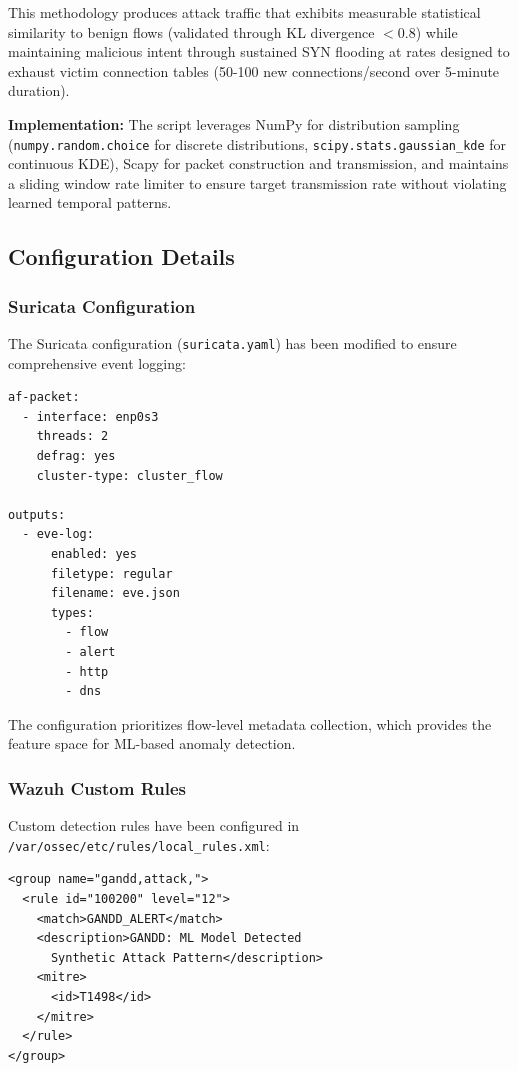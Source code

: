 This methodology produces attack traffic that exhibits measurable statistical similarity to benign flows (validated through KL divergence $< 0.8$) while maintaining malicious intent through sustained SYN flooding at rates designed to exhaust victim connection tables (50-100 new connections/second over 5-minute duration).

\textbf{Implementation:} The script leverages NumPy for distribution sampling (\texttt{numpy.random.choice} for discrete distributions, \texttt{scipy.stats.gaussian\_kde} for continuous KDE), Scapy for packet construction and transmission, and maintains a sliding window rate limiter to ensure target transmission rate without violating learned temporal patterns.

\label{sec:adversarial_attack}

\subsection{Configuration Details}

\subsubsection{Suricata Configuration}

The Suricata configuration (\texttt{suricata.yaml}) has been modified to ensure comprehensive event logging:

\begin{verbatim}
af-packet:
  - interface: enp0s3
    threads: 2
    defrag: yes
    cluster-type: cluster_flow
    
outputs:
  - eve-log:
      enabled: yes
      filetype: regular
      filename: eve.json
      types:
        - flow
        - alert
        - http
        - dns
\end{verbatim}

The configuration prioritizes flow-level metadata collection, which provides the feature space for ML-based anomaly detection.

\subsubsection{Wazuh Custom Rules}

Custom detection rules have been configured in \texttt{/var/ossec/etc/rules/local\_rules.xml}:

\begin{verbatim}
<group name="gandd,attack,">
  <rule id="100200" level="12">
    <match>GANDD_ALERT</match>
    <description>GANDD: ML Model Detected 
      Synthetic Attack Pattern</description>
    <mitre>
      <id>T1498</id>
    </mitre>
  </rule>
</group>
\end{verbatim}

